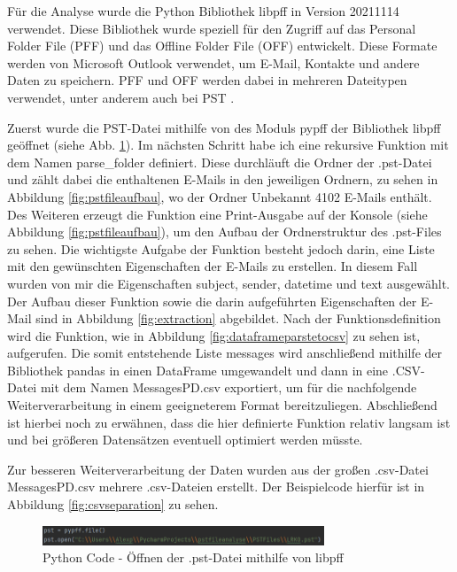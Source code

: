 Für die Analyse wurde die Python Bibliothek \glqq{}libpff\grqq{} in Version 20211114 verwendet. Diese Bibliothek wurde speziell für den Zugriff auf das Personal Folder File (PFF) und das Offline Folder File (OFF) entwickelt. Diese Formate werden von Microsoft Outlook verwendet, um E-Mail, Kontakte und andere Daten zu speichern. PFF und OFF werden dabei in mehreren Dateitypen verwendet, unter anderem auch bei PST \cite{GitHub.26.06.2022}.

Zuerst wurde die PST-Datei mithilfe von des Moduls pypff der Bibliothek libpff geöffnet (siehe Abb. \ref{fig:fileopen}). Im nächsten Schritt habe ich eine rekursive Funktion mit dem Namen parse\_folder definiert. Diese durchläuft die Ordner der .pst-Datei und zählt dabei die enthaltenen E-Mails in den jeweiligen Ordnern, zu sehen in Abbildung \ref{fig:pstfileaufbau}, wo der Ordner Unbekannt 4102 E-Mails enthält. Des Weiteren erzeugt die Funktion eine Print-Ausgabe auf der Konsole (siehe Abbildung \ref{fig:pstfileaufbau}), um den Aufbau der Ordnerstruktur des .pst-Files zu sehen. Die wichtigste Aufgabe der Funktion besteht jedoch darin, eine Liste mit den gewünschten Eigenschaften der E-Mails zu erstellen. In diesem Fall wurden von mir die Eigenschaften \glqq{}subject\grqq{}, \glqq{}sender\grqq{}, \glqq{}datetime\grqq{} und \glqq{}text\grqq{} ausgewählt. Der Aufbau dieser Funktion sowie die darin aufgeführten Eigenschaften der E-Mail sind in Abbildung \ref{fig:extraction} abgebildet. Nach der Funktionsdefinition wird die Funktion, wie in Abbildung \ref{fig:dataframeparstetocsv} zu sehen ist, aufgerufen. Die somit entstehende Liste \glqq{}messages\grqq{} wird anschließend mithilfe der Bibliothek pandas in einen DataFrame umgewandelt und dann in eine .CSV-Datei mit dem Namen \glqq{}MessagesPD.csv\grqq{} exportiert, um für die nachfolgende Weiterverarbeitung in einem geeigneterem Format bereitzuliegen. Abschließend ist hierbei noch zu erwähnen, dass die hier definierte Funktion relativ langsam ist und bei größeren Datensätzen eventuell optimiert werden müsste.

Zur besseren Weiterverarbeitung der Daten wurden aus der großen .csv-Datei \glqq{}MessagesPD.csv\grqq{} mehrere .csv-Dateien erstellt. Der Beispielcode hierfür ist in Abbildung \ref{fig:csvseparation} zu sehen.



\begin{figure}
    \centering
    \includegraphics[width=0.75\textwidth]{images/File_open_libpff.PNG}
    \caption{Python Code - Öffnen der .pst-Datei mithilfe von libpff} 
    \label{fig:fileopen}
\end{figure}

